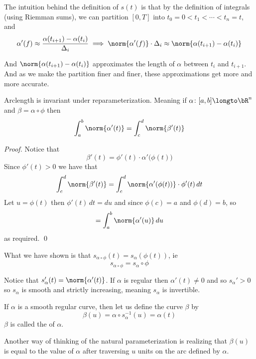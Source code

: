 The intuition behind the definition of $s(t)$ is that by the definition of integrals (using Riemman sums), we can partition $[0,T]$ into $t_0=0<t_1<\cdots<t_n=t$, and
\[ \alpha'(f) \approx \frac{\alpha(t_{i+1})-\alpha(t_i)}{\Delta_i} \implies \norm{\alpha'(f)}\cdot\Delta_i \approx \norm{\alpha(t_{i+1})-\alpha(t_i)} \]

\newpage
And $\norm{\alpha(t_{i+1})-\alpha(t_i)}$ approximates the length of $\alpha$ between $t_i$ and $t_{i+1}$.
And as we make the partition finer and finer, these approximations get more and more accurate.

\begin{prop*}

    Arclength is invariant under reparameterization.
    Meaning if $\alpha\colon[a,b]\longto\bR^n$ and $\beta=\alpha\circ\phi$ then
    \[ \int_a^b\norm{\alpha'(t)} = \int_c^d\norm{\beta'(t)} \]

\end{prop*}

\begin{proof}

    Notice that
    \[ \beta'(t) = \phi'(t)\cdot\alpha'\bigl(\phi(t)\bigr) \]
    Since $\phi'(t)>0$ we have that
    \[ \int_c^d\norm{\beta'(t)} = \int_c^d\norm{\alpha'(\phi(t))}\cdot\phi'(t)\,dt \]
    Let $u=\phi(t)$ then $\phi'(t)\,dt=du$ and since $\phi(c)=a$ and $\phi(d)=b$, so
    \[ = \int_a^b\norm{\alpha'(u)}\,du \]
    as required.
    \qed

\end{proof}

What we have shown is that $s_{\alpha\circ\phi}(t)=s_\alpha(\phi(t))$, ie
\[ s_{\alpha\circ\phi} = s_\alpha\circ\phi \]

Notice that $s_\alpha'(t)=\norm{\alpha'(t)}$.
If $\alpha$ is regular then $\alpha'(t)\neq0$ and so $s_\alpha'>0$ so $s_\alpha$ is smooth and strictly increasing, meaning $s_\alpha$ is invertible.

\begin{defn*}

    If $\alpha$ is a smooth regular curve, then let us define the curve $\beta$ by
    \[ \beta(u) = \alpha\circ s_\alpha^{-1}(u) = \alpha(t) \]
    $\beta$ is called the  of $\alpha$.

\end{defn*}

Another way of thinking of the natural parameterization is realizing that $\beta(u)$ is equal to the value of $\alpha$ after traversing $u$ units on the arc defined by $\alpha$.


